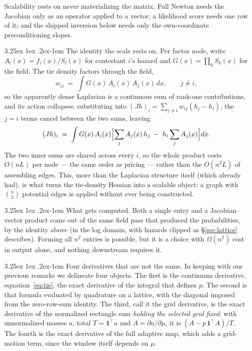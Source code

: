 \documentclass[11pt]{article}
\makeatletter
\renewcommand\paragraph{\@startsection{paragraph}{4}{\z@}%
  {3.25ex \@plus1ex \@minus.2ex}{-1em}%
  {\normalfont\normalsize\itshape}}
\makeatother
\begin{document}
Scalability rests on never materializing the matrix. Full Newton needs
the Jacobian only as an operator applied to a vector; a likelihood score
needs one row of it; and the shipped inversion below needs only the
own-coordinate preconditioning slopes.

\paragraph{The identity the scale rests on.} Per factor node, write
$A_i(x)=f_i(x)/S_i(x)$ for contestant $i$'s hazard and
$G(x)=\prod_k S_k(x)$ for the field. The tie density factors through the
field,
\[
w_{ij}\;=\;\int G(x)\,A_i(x)\,A_j(x)\,dx ,\qquad j\ne i,
\]
so the apparently dense Laplacian is a continuous sum of rank-one
contributions, and its action collapses: substituting into
$(Jh)_i=\sum_{j\ne i}w_{ij}(h_j-h_i)$, the $j=i$ terms cancel between
the two sums, leaving
\[
(Jh)_i\;=\;\int G(x)\,A_i(x)
 \Bigl[\sum_{j} A_j(x)\,h_j\;-\;h_i\sum_{j} A_j(x)\Bigr]dx .
\]
The two inner sums are shared across every $i$, so the whole product
costs $O(nL)$ per node --- the same order as pricing --- rather than the
$O(n^2L)$ of assembling edges. This, more than the Laplacian structure
itself (which \citet{muller2022} already had), is what turns the
tie-density Hessian into a scalable object: a graph with $\binom{n}{2}$
potential edges is applied without ever being constructed.

\paragraph{What gets computed.} Both a single entry and a
Jacobian--vector product come out of the same field pass that produced
the probabilities, by the identity above (in the log domain, with
hazards clipped as \S\ref{sec:lattice} describes). Forming all $n^{2}$
entries is possible, but it is a choice with $\Omega(n^{2})$ cost in
output alone, and nothing downstream requires it.

\paragraph{Four derivatives that are not the same.} In keeping with our
previous remarks we delineate four objects. The first is the continuum
derivative, equation~\eqref{eq:tie}, the exact derivative of the integral
that defines $p$. The second is that formula evaluated by quadrature on a
lattice, with the diagonal imposed from the zero-row-sum identity. The
third, call it the grid derivative, is the exact derivative of the
normalized rectangle sum \emph{holding the selected grid fixed}: with
unnormalized masses $a$, total $T=\mathbf{1}^{\top}a$ and $A=\partial
a/\partial\mu$, it is $(A-p\,\mathbf{1}^{\top}A)/T$. The fourth is the
exact derivative of the full adaptive map, which adds a grid-motion term,
since the window itself depends on $\mu$.
\end{document}
